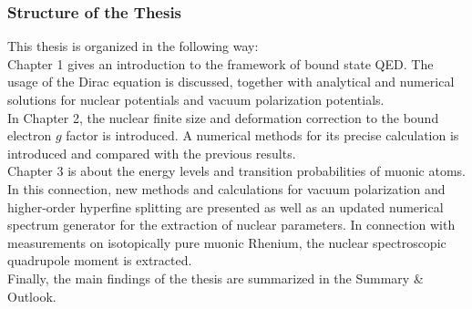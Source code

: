 \subsubsection*{Structure of the Thesis}

This thesis is organized in the following way:\\
Chapter 1 gives an introduction to the framework of bound state QED. The usage of the Dirac equation is discussed, together with analytical and numerical solutions for nuclear potentials and vacuum polarization potentials.\\
In Chapter 2, the nuclear finite size and deformation correction to the bound electron $g$ factor is introduced. A numerical methods for its precise calculation is introduced and compared with the previous results.\\
Chapter 3 is about the energy levels and transition probabilities of muonic atoms. In this connection, new methods and calculations for vacuum polarization and higher-order hyperfine splitting are presented as well as an updated numerical spectrum generator for the extraction of nuclear parameters. In connection with measurements on isotopically pure muonic Rhenium, the nuclear spectroscopic quadrupole moment is extracted.\\
Finally, the main findings of the thesis are summarized in the Summary \& Outlook.




































